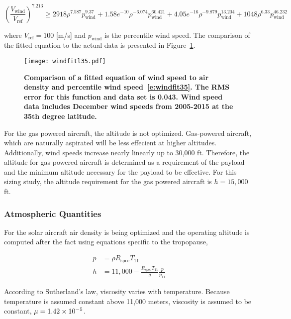 \documentclass[]{aiaa-tc}%
\begin{document}
\begin{equation}
    \label{e:windfit35}
    \left(\frac{V_{\text{wind}}}{V_{\text{ref}}}\right)^{7.213} \geq 2918\rho^{7.587}p_{\text{wind}}^{9.37} + 1.58e^{-10}\rho^{-6.074}p_{\text{wind}}^{60.421} + 4.05e^{-16}\rho^{-9.879}p_{\text{wind}}^{13.204} + 1048\rho^{6.33}p_{\text{wind}}^{46.232}
\end{equation}

where $V_{\text{ref}} = 100$ [m/s] and $p_{\text{wind}}$ is the percentile wind speed. The comparison of the fitted equation to the actual data is presented in Figure~\ref{f:windfitl35}. 

\begin{figure}[H]
	\begin{center}
	\texttt{[image: windfitl35.pdf]}
    \caption{ \textbf{ Comparison of a fitted equation of wind speed to air density and percentile wind speed~\eqref{e:windfit35}. The RMS error for this function and data set is 0.043. Wind speed data includes December wind speeds from 2005-2015 at the 35th degree latitude. }}
	\label{f:windfitl35}
	\end{center}
\end{figure}


For the gas powered aircraft, the altitude is not optimized.  
Gas-powered aircraft, which are naturally aspirated will be less effecient at higher altitudes.  
Additionally, wind speeds increase nearly linearly up to 30,000 ft.  
Therefore, the altitude for gas-powered aircraft is determined as a requirement of the payload and the minimum altitude necessary for the payload to be effective. 
For this sizing study, the altitude requirement for the gas powered aircraft is $h=15,000$ ft.

\subsubsection{Atmospheric Quantities}

For the solar aircraft air density is being optimized and the operating altitude is computed after the fact using equations specific to the tropopause,\cite{isaatm} 

\begin{align}
    \label{e:tropopress}
    p &= \rho R_{\text{spec}}T_{11} \\
    \label{e:tropoalt}
    h &= 11,000 - \frac{R_{\text{spec}}T_{11}}{g}\frac{p}{p_{11}} 
\end{align}

According to Sutherland's law\cite{fluiddyhandbook}, viscosity varies with temperature.  Because temperature is assumed constant above 11,000 meters\cite{isaatm}, viscosity is assumed to be constant, $\mu=\num{1.42d-5}$. \\
\end{document}
